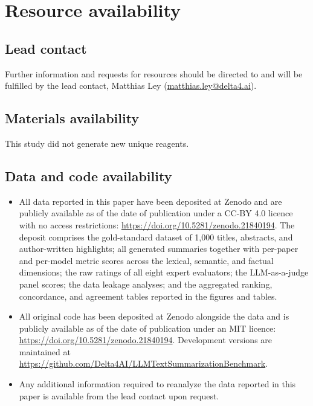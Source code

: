\section{Resource availability}

\subsection{Lead contact}

Further information and requests for resources should be directed to and will be fulfilled by the lead contact, Matthias Ley (\href{mailto:matthias.ley@delta4.ai}{matthias.ley@delta4.ai}).

\subsection{Materials availability}

This study did not generate new unique reagents.

\subsection{Data and code availability}

\begin{itemize}
    \item All data reported in this paper have been deposited at Zenodo and are publicly available as of the date of publication under a CC-BY 4.0 licence with no access restrictions: \url{https://doi.org/10.5281/zenodo.21840194}. The deposit comprises the gold-standard dataset of 1,000 titles, abstracts, and author-written highlights; all generated summaries together with per-paper and per-model metric scores across the lexical, semantic, and factual dimensions; the raw ratings of all eight expert evaluators; the \ac{LLM}-as-a-judge panel scores; the data leakage analyses; and the aggregated ranking, concordance, and agreement tables reported in the figures and tables.
    \item All original code has been deposited at Zenodo alongside the data and is publicly available as of the date of publication under an MIT licence: \url{https://doi.org/10.5281/zenodo.21840194}. Development versions are maintained at \url{https://github.com/Delta4AI/LLMTextSummarizationBenchmark}.
    \item Any additional information required to reanalyze the data reported in this paper is available from the lead contact upon request.
\end{itemize}

